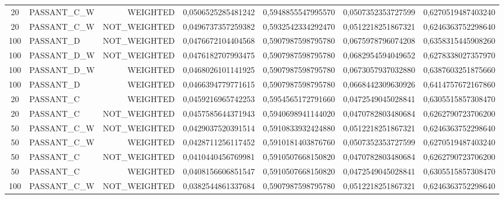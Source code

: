 \begin{table}[H]
{\begin{tabular}{ c l r c c c c }
	20 & PASSANT\_C\_W &   WEIGHTED & 0,0506525285481242 & 0,5948855547995570 & 0,0507352353727599 & 0,6270519487403240 \\
	
	20 & PASSANT\_C\_W & NOT\_WEIGHTED & 0,0496737357259382 & 0,5932542334292470 & 0,0512218251867321 & 0,6246363752298640 \\
	
	100 &  PASSANT\_D & NOT\_WEIGHTED & 0,0476672104404568 & 0,5907987598795780 & 0,0675978796074208 & 0,6358315445908260 \\
	
	100 & PASSANT\_D\_W & NOT\_WEIGHTED & 0,0476182707993475 & 0,5907987598795780 & 0,0682954594049652 & 0,6278338027357970 \\
	
	100 & PASSANT\_D\_W &   WEIGHTED & 0,0468026101141925 & 0,5907987598795780 & 0,0673057937032880 & 0,6387603251875660 \\
	
	100 &  PASSANT\_D &   WEIGHTED & 0,0466394779771615 & 0,5907987598795780 & 0,0668442309630926 & 0,6414757672167860 \\
	
	20 &  PASSANT\_C &   WEIGHTED & 0,0459216965742253 & 0,5954565172791660 & 0,0472549045028841 & 0,6305515857308470 \\
	
	20 &  PASSANT\_C & NOT\_WEIGHTED & 0,0457585644371943 & 0,5940698941144020 & 0,0470782803480684 & 0,6262790723706200 \\
	
	50 & PASSANT\_C\_W & NOT\_WEIGHTED & 0,0429037520391514 & 0,5910833932424880 & 0,0512218251867321 & 0,6246363752298640 \\
	
	50 & PASSANT\_C\_W &   WEIGHTED & 0,0428711256117452 & 0,5910181403876760 & 0,0507352353727599 & 0,6270519487403240 \\
	
	50 &  PASSANT\_C & NOT\_WEIGHTED & 0,0410440456769981 & 0,5910507668150820 & 0,0470782803480684 & 0,6262790723706200 \\
	
	50 &  PASSANT\_C &   WEIGHTED & 0,0408156606851547 & 0,5910507668150820 & 0,0472549045028841 & 0,6305515857308470 \\
	
	100 & PASSANT\_C\_W & NOT\_WEIGHTED & 0,0382544861337684 & 0,5907987598795780 & 0,0512218251867321 & 0,6246363752298640 \\
	

\end{tabular}}
\end{table}
